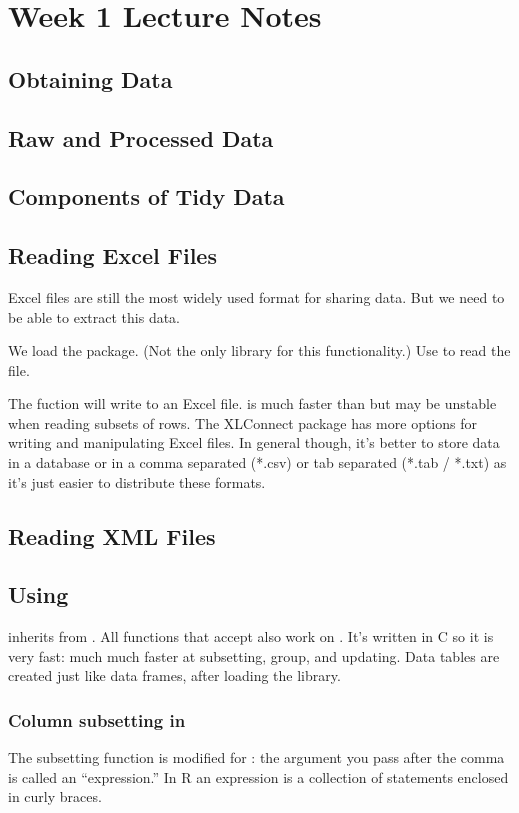 \chapter*{Week 1 Lecture Notes}
\section{Obtaining Data}

\section{Raw and Processed Data}

\section{Components of Tidy Data}

\section{Reading Excel Files}
Excel files are still the most widely used format for sharing data. But we need to be able to extract this data.

We load the  package. (Not the only library for this functionality.) Use  to read the file.

The  fuction will write to an Excel file.  is much faster than  but may be unstable when reading subsets of rows. The XLConnect package has more options for writing and manipulating Excel files. In general though, it's better to store data in a database or in a comma separated (*.csv) or tab separated (*.tab / *.txt) as it's just easier to distribute these formats.

\section{Reading XML Files}

\section{Using }

 inherits from . All functions that accept  also work on . It's written in C so it is very fast: much much faster at subsetting, group, and updating. Data tables are created just like data frames, after loading the  library.

\subsection{Column subsetting in }
The subsetting function is modified for : the argument you pass after the comma is called an ``expression.'' In R an expression is a collection of statements enclosed in curly braces.